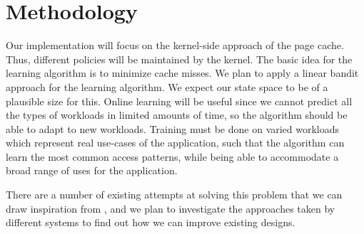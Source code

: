 \section{Methodology}

Our implementation will focus on the kernel-side approach of the page cache. Thus, different policies will be maintained by the kernel. The basic idea for the learning algorithm is to minimize cache misses. We plan to apply a linear bandit approach for the learning algorithm. We expect our state space to be of a plausible size for this. Online learning will be useful since we cannot predict all the types of workloads in limited amounts of time, so the algorithm should be able to adapt to new workloads. Training must be done on varied workloads which represent real use-cases of the application, such that the algorithm can learn the most common access patterns, while being able to accommodate a broad range of uses for the application.

There are a number of existing attempts at solving this problem that we can draw inspiration from \cite{Megiddo:2004}\cite{Zhu:2007}, and we plan to investigate the approaches taken by different systems to find out how we can improve existing designs.
